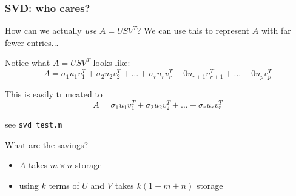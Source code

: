 \documentclass[10pt]{beamer}
\begin{document}
\begin{frame}
\frametitle{SVD: who cares?}
How can we actually \emph{use} $A=USV^T$?  We can use this to represent $A$ with far fewer entries...
\bigskip

Notice what $A=USV^T$ looks like:
\[
    A = \sigma_1 u_1 v_1^T + \sigma_2 u_2 v_2^T + \dots + \sigma_r u_r v_r^T +
0u_{r+1}v_{r+1}^T + \dots + 0u_{p} v_{p}^T
\]
\bigskip

This is easily truncated to
\[
    A = \sigma_1 u_1 v_1^T + \sigma_2 u_2 v_2^T + \dots + \sigma_r u_r v_r^T
\]
\bigskip

see \texttt{svd\_test.m}

What are the savings?  
\begin{itemize}
    \item $A$ takes $m\times n$ storage
    \item using $k$ terms of $U$ and $V$ takes $k(1 + m + n)$ storage
\end{itemize}
\end{frame}
\end{document}
